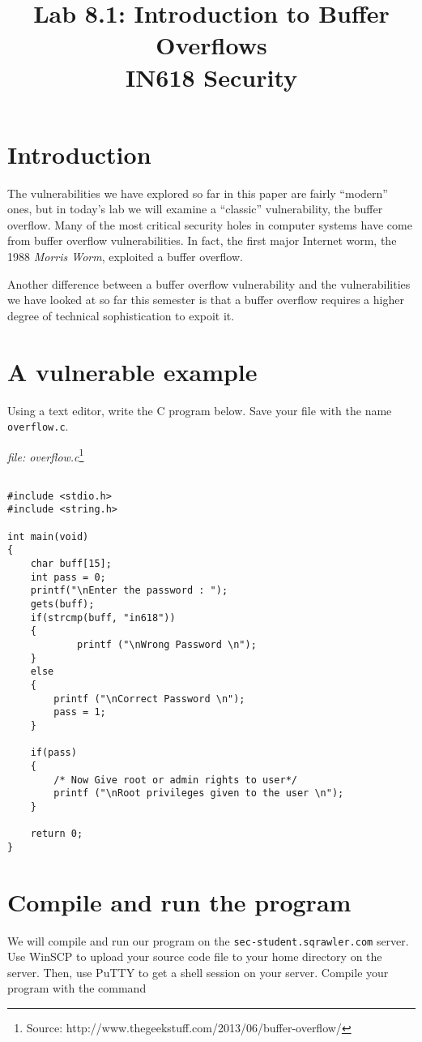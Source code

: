 \documentclass{article}
\begin{document}
\title{ Lab 8.1: Introduction to Buffer Overflows\\ IN618 Security}
\maketitle

\section*{Introduction}
The vulnerabilities we have explored so far in this paper are fairly ``modern'' ones,
but in today's lab we will examine a ``classic'' vulnerability, the buffer overflow. 
Many of the most critical security holes in computer systems have come from buffer
overflow vulnerabilities. In fact, the first major Internet worm, the 1988 \emph{Morris Worm},
exploited a buffer overflow.

Another difference between a buffer overflow vulnerability and the vulnerabilities we have
looked at so far this semester is that a buffer overflow requires a higher degree of technical
sophistication to expoit it.

\section{A vulnerable example}
Using a text editor, write the C program below. Save your file with the name \texttt{overflow.c}.

\emph{file: overflow.c}\footnote{Source: http://www.thegeekstuff.com/2013/06/buffer-overflow/} 
\begin{verbatim}

#include <stdio.h>
#include <string.h>

int main(void)
{
    char buff[15];
    int pass = 0;
    printf("\nEnter the password : ");
    gets(buff);
    if(strcmp(buff, "in618"))
    {
            printf ("\nWrong Password \n");
    }
    else
    {
        printf ("\nCorrect Password \n");
        pass = 1;
    }

    if(pass)
    {
        /* Now Give root or admin rights to user*/
        printf ("\nRoot privileges given to the user \n");
    }

    return 0;
}

\end{verbatim}

\section{Compile and run the program}
We will compile and run our program on the \texttt{sec-student.sqrawler.com} server.  Use  
WinSCP to upload your source code file to your home directory on the server. Then, use 
PuTTY to get a shell session on your server.  Compile your program with the command
\end{document}
